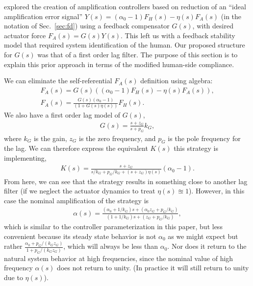  explored the creation of amplification controllers based on reduction of an ``ideal amplification error signal'' $Y(s)=(\alpha_0-1)F_H(s)-\eta(s) F_A(s)$ (in the notation of Sec.~\ref{sec:fd}) using a feedback compensator $G(s)$, with desired actuator force $F_A(s) = G(s) Y(s)$. This left us with a feedback stability model that required system identification of the human. Our proposed structure for $G(s)$ was that of a first order lag filter. The purpose of this section is to explain this prior approach in terms of the modified human-side compliance.

We can eliminate the self-referential $F_A(s)$ definition using algebra:
\begin{gather}
F_A(s) = G(s)((\alpha_0-1)F_H(s)-\eta(s) F_A(s)),\\
F_A(s) = \frac{G(s)(\alpha_0-1)}{(1+G(s)\eta(s))} F_H(s).\end{gather}
We also have a first order lag model of $G(s)$,
\begin{gather}
G(s) = \frac{s+z_G}{s+p_G}k_G,
\end{gather}
where $k_G$ is the gain, $z_G$ is the zero frequency, and $p_G$ is the pole frequency for the lag. We can therefore express the equivalent $K(s)$ this strategy is implementing,
\begin{gather}
K(s) = \frac{s+z_G}{s/k_G + p_G/k_G+(s+z_G)\eta(s)}(\alpha_0-1).
\end{gather}
From here, we can see that the strategy results in something close to another lag filter (if we neglect the actuator dynamics to treat $\eta(s)\approxeq 1$). However, in this case the nominal amplification of the strategy is 
\begin{gather}
\alpha(s) = \frac{(\alpha_0 + 1/k_G) s + (\alpha_0 z_G + p_G/k_G)}{(1+1/k_G)s + (z_G+ p_G/k_G)},
\end{gather}
which is similar to the controller parameterization in this paper, but less convenient because its steady state behavior is not $\alpha_0$ as we might expect but rather $\frac{\alpha_0 + p_G/(k_G z_G)}{1+p_G/(k_G z_G)}$, which will always be less than  $\alpha_0$. Nor does it return to the natural system behavior at high frequencies, since the nominal value of high frequency $\alpha(s)$ does not return to unity. (In practice it will still return to unity due to $\eta(s)$).



